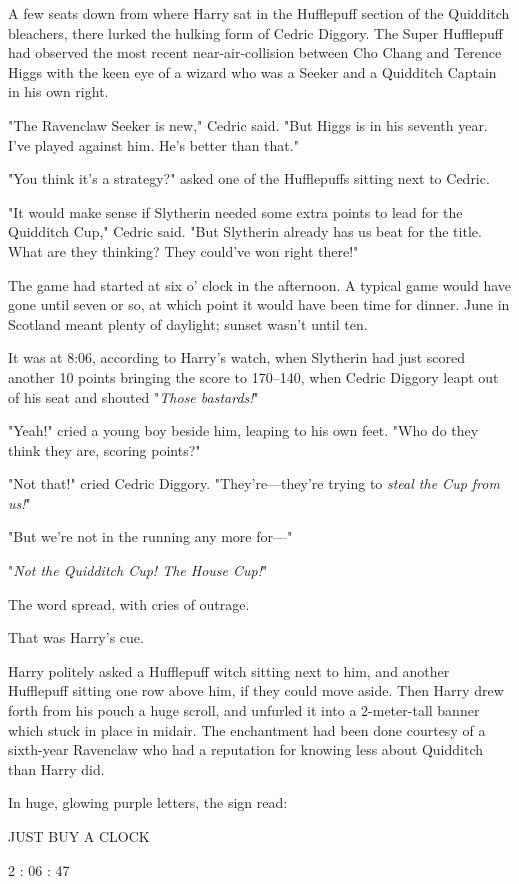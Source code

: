 A few seats down from where Harry sat in the Hufflepuff section of the
Quidditch bleachers, there lurked the hulking form of Cedric Diggory. The Super
Hufflepuff had observed the most recent near-air-collision between Cho Chang
and Terence Higgs with the keen eye of a wizard who was a Seeker and a
Quidditch Captain in his own right.

"The Ravenclaw Seeker is new," Cedric said. "But Higgs is in his seventh year.
I've played against him. He's better than that."

"You think it's a strategy?" asked one of the Hufflepuffs sitting next to
Cedric.

"It would make sense if Slytherin needed some extra points to lead for the
Quidditch Cup," Cedric said. "But Slytherin already has us beat for the title.
What are they thinking? They could've won right there!"

The game had started at six o' clock in the afternoon. A typical game would
have gone until seven or so, at which point it would have been time for dinner.
June in Scotland meant plenty of daylight; sunset wasn't until ten.

It was at 8:06\PM , according to Harry's watch, when Slytherin
had just scored another 10 points bringing the score to 170--{140}, when Cedric
Diggory leapt out of his seat and shouted "\emph{Those bastards!}"

"Yeah!" cried a young boy beside him, leaping to his own feet. "Who do they
think they are, scoring points?"

"Not that!" cried Cedric Diggory. "They're—they're trying to \emph{steal the
Cup from us!}"

"But we're not in the running any more for—"

"\emph{Not the Quidditch Cup! The House Cup!}"

The word spread, with cries of outrage.

That was Harry's cue.

Harry politely asked a Hufflepuff witch sitting next to him, and another
Hufflepuff sitting one row above him, if they could move aside. Then Harry drew
forth from his pouch a huge scroll, and unfurled it into a 2-meter-tall banner
which stuck in place in midair. The enchantment had been done courtesy of a
sixth-year Ravenclaw who had a reputation for knowing less about Quidditch than
Harry did.

In huge, glowing purple letters, the sign read:

\begin{center}
JUST BUY A CLOCK

2 : 06 : 47
\end{center}

